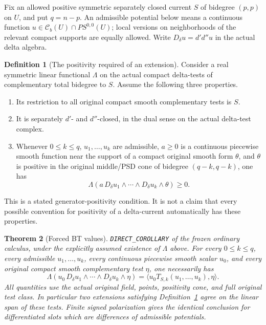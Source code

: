 \documentclass[11pt,a4paper]{article}
\numberwithin{equation}{section}
\newtheorem{theorem}{Theorem}[section]
\theoremstyle{definition}
\newtheorem{definition}[theorem]{Definition}
\theoremstyle{remark}
\begin{document}
Fix an allowed positive symmetric separately closed current $S$ of
bidegree $(p,p)$ on $U$, and put $q=n-p$.  An admissible potential below
means a continuous function $u\in\mathcal C_b(U)\cap PS^{0,0}(U)$;
local versions on neighborhoods of the relevant compact supports are
equally allowed.  Write $D_\delta u=d'd''u$ in the actual delta algebra.

\begin{definition}[The positivity required of an extension]
\label{def:r6-generator-positive-extension}
Consider a real symmetric linear functional $\Lambda$ on the actual
compact delta-tests of complementary total bidegree to $S$.  Assume
the following three properties.
\begin{enumerate}
\item Its restriction to all original compact smooth complementary
      tests is $S$.
\item It is separately $d'$- and $d''$-closed, in the dual sense on
      the actual delta-test complex.
\item Whenever $0\leq k\leq q$, $u_1,\ldots,u_k$ are admissible,
      $a\geq0$ is a continuous piecewise smooth function near the
      support of a compact original smooth form $\theta$, and
      $\theta$ is positive in the original middle/PSD cone of
      bidegree $(q-k,q-k)$, one has
      \[
       \Lambda\!\left(a\,D_\delta u_1\wedge\cdots\wedge
                                D_\delta u_k\wedge\theta\right)\geq0.
      \]
\end{enumerate}
This is a stated generator-positivity condition.  It is not a claim
that every possible convention for positivity of a delta-current
automatically has these properties.
\end{definition}

\begin{theorem}[Forced BT values]
\label{thm:r6-forced-delta-bt-values}
\textnormal{\texttt{DIRECT\_COROLLARY}} of the frozen ordinary calculus,
under the explicitly assumed existence of $\Lambda$ above.
For every $0\leq k\leq q$, every admissible $u_1,\ldots,u_k$, every
continuous piecewise smooth scalar $u_0$, and every original compact
smooth complementary test $\eta$, one necessarily has
\[
 \Lambda\!\left(u_0\,D_\delta u_1\wedge\cdots\wedge
                              D_\delta u_k\wedge\eta\right)
       =\bigl\langle u_0 T_{S,k}(u_1,\ldots,u_k),\eta\bigr\rangle.
\]
All quantities use the actual original field, points, positivity
cone, and full original test class.  In particular two extensions
satisfying Definition~\ref{def:r6-generator-positive-extension}
agree on the linear span of these tests.  Finite signed polarization
gives the identical conclusion for differentiated slots which are
differences of admissible potentials.
\end{theorem}
\end{document}
